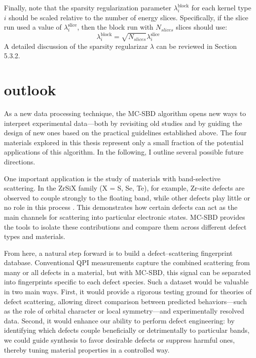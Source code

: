 Finally, note that the sparsity regularization parameter $\lambda_i^{\text{block}}$ for each kernel type $i$ should be scaled relative to the number of energy slices. Specifically, if the slice run used a value of $\lambda_i^{\text{slice}}$, then the block run with $N_{slices}$ slices should use:
\begin{equation}
	\lambda_i^{\text{block}} = \sqrt{N_{slices}}\lambda_i^{\text{slice}}
\end{equation}
A detailed discussion of the sparsity regularizar $\lambda$ can be reviewed in Section 5.3.2. 

\section{outlook}
As a new data processing technique, the MC-SBD algorithm opens new ways to interpret experimental data—both by revisiting old studies and by guiding the design of new ones based on the practical guidelines established above. The four materials explored in this thesis represent only a small fraction of the potential applications of this algorithm. In the following, I outline several possible future directions.

One important application is the study of materials with band-selective scattering. In the ZrSiX family (X = S, Se, Te), for example, Zr-site defects are observed to couple strongly to the floating band, while other defects play little or no role in this process \cite{butlerQuasiparticleInterferenceZrSiS2017,buVisualizationElectronicTopology2018,stuartScanningTunnellingMicroscopy2021}. This demonstrates how certain defects can act as the main channels for scattering into particular electronic states. MC-SBD provides the tools to isolate these contributions and compare them across different defect types and materials.

From here, a natural step forward is to build a defect–scattering fingerprint database. Conventional QPI measurements capture the combined scattering from many or all defects in a material, but with MC-SBD, this signal can be separated into fingerprints specific to each defect species. Such a dataset would be valuable in two main ways. First, it would provide a rigorous testing ground for theories of defect scattering, allowing direct comparison between predicted behaviors—such as the role of orbital character or local symmetry—and experimentally resolved data. Second, it would enhance our ability to perform defect engineering: by identifying which defects couple beneficially or detrimentally to particular bands, we could guide synthesis to favor desirable defects or suppress harmful ones, thereby tuning material properties in a controlled way.

